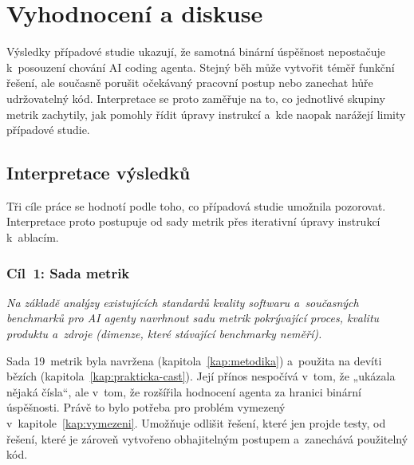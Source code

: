 \chapter{Vyhodnocení a diskuse}
\label{kap:vyhodnoceni}
\label{kap:vysledky}

Výsledky případové studie ukazují, že samotná binární úspěšnost
nepostačuje k~posouzení chování AI coding agenta. Stejný běh může
vytvořit téměř funkční řešení, ale současně porušit očekávaný pracovní
postup nebo zanechat hůře udržovatelný kód. Interpretace se proto
zaměřuje na to, co jednotlivé skupiny metrik zachytily, jak pomohly
řídit úpravy instrukcí a~kde naopak narážejí limity případové studie.

\section{Interpretace výsledků}
\label{sec:interpretace}

Tři cíle práce se hodnotí podle toho, co případová studie umožnila
pozorovat. Interpretace proto postupuje od sady metrik přes iterativní
úpravy instrukcí k~ablacím.

\subsection{Cíl~1: Sada metrik}
\label{sec:vyhodnoceni-cil1}

\textit{Na základě analýzy existujících standardů kvality softwaru
a~současných benchmarků pro AI agenty navrhnout sadu metrik
pokrývající proces, kvalitu produktu a~zdroje (dimenze,
které stávající benchmarky neměří).}

Sada 19~metrik byla navržena (kapitola~\ref{kap:metodika}) a~použita
na devíti bězích (kapitola~\ref{kap:prakticka-cast}). Její přínos
nespočívá v~tom, že „ukázala nějaká čísla“, ale v~tom, že rozšířila
hodnocení agenta za hranici binární úspěšnosti. Právě to bylo potřeba
pro problém vymezený v~kapitole~\ref{kap:vymezeni}. Umožňuje odlišit řešení,
které jen projde testy, od řešení, které je zároveň vytvořeno
obhajitelným postupem a~zanechává použitelný kód.

